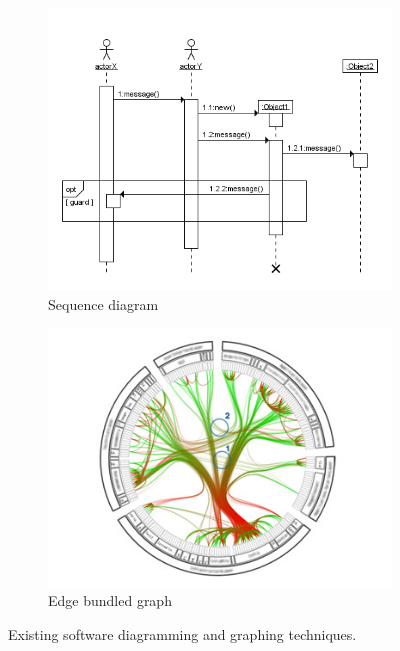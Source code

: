 \begin{figure}
\begin{subfigure}{.5\textwidth}
  \includegraphics[width=.95\linewidth]{../images/code-visualisations/sequence-diagram.png}
  \caption{Sequence diagram}
  \label{fig:sequence-diagram}
\end{subfigure}%
\begin{subfigure}{.5\textwidth}
  \includegraphics[width=.95\linewidth]{../images/code-visualisations/bundle-graph.jpg}
  \caption{Edge bundled graph}
  \label{fig:bundle-graph}
\end{subfigure}

\caption[Existing software diagramming and graphing techniques]{Existing software diagramming and graphing techniques.}
\label{fig:code-diagrams}
\end{figure}